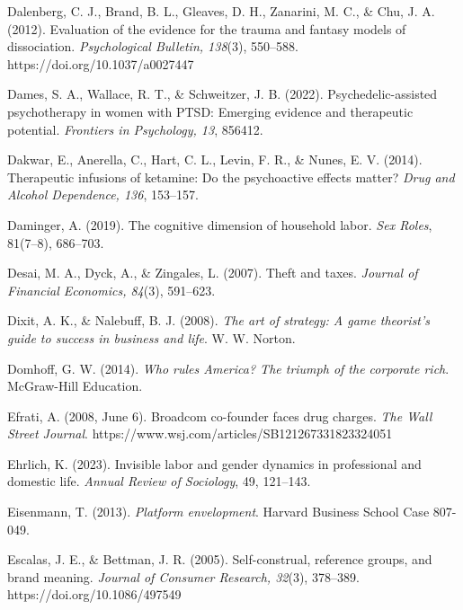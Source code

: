 \begin{thebibliography}{}

    Dalenberg, C. J., Brand, B. L., Gleaves, D. H., Zanarini, M. C., \& Chu, J. A. (2012). Evaluation of the evidence for the trauma and fantasy models of dissociation. \textit{Psychological Bulletin, 138}(3), 550–588. https://doi.org/10.1037/a0027447

    Dames, S. A., Wallace, R. T., \& Schweitzer, J. B. (2022). Psychedelic-assisted psychotherapy in women with PTSD: Emerging evidence and therapeutic potential. \textit{Frontiers in Psychology, 13}, 856412.

    Dakwar, E., Anerella, C., Hart, C. L., Levin, F. R., \& Nunes, E. V. (2014). Therapeutic infusions of ketamine: Do the psychoactive effects matter? \textit{Drug and Alcohol Dependence, 136}, 153–157.

    Daminger, A. (2019). The cognitive dimension of household labor. \textit{Sex Roles}, 81(7–8), 686–703.

    Desai, M. A., Dyck, A., \& Zingales, L. (2007). Theft and taxes. \textit{Journal of Financial Economics, 84}(3), 591–623.

    Dixit, A. K., \& Nalebuff, B. J. (2008). \textit{The art of strategy: A game theorist’s guide to success in business and life}. W. W. Norton.

    Domhoff, G. W. (2014). \textit{Who rules America? The triumph of the corporate rich}. McGraw-Hill Education.


    Efrati, A. (2008, June 6). Broadcom co-founder faces drug charges. \textit{The Wall Street Journal}. https://www.wsj.com/articles/SB121267331823324051
    
    Ehrlich, K. (2023). Invisible labor and gender dynamics in professional and domestic life. \textit{Annual Review of Sociology}, 49, 121–143.

    Eisenmann, T. (2013). \textit{Platform envelopment}. Harvard Business School Case 807-049.

    Escalas, J. E., \& Bettman, J. R. (2005). Self-construal, reference groups, and brand meaning. \textit{Journal of Consumer Research, 32}(3), 378--389. https://doi.org/10.1086/497549


\end{thebibliography}
